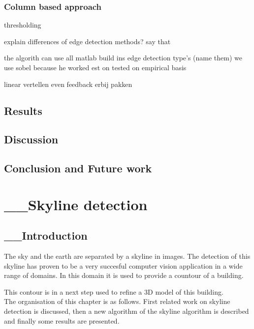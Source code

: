 \documentclass[10pt]{article}
\begin{document}
\subsubsection{Column based approach}

thresholding


explain differences of edge detection methods?
say that 

the algorith can use all matlab build ins edge detection type's (name them)
we use sobel because he worked est on tested on empirical basis

linear vertellen
even feedback erbij pakken


\subsection{Results}%
\subsection{Discussion}  %
\subsection{Conclusion and Future work}





\section{__Skyline detection}
 \subsection{__Introduction}

The sky and the earth are separated by a skyline in images. The detection of this skyline
has proven to be a very succesful computer vision application in a wide range of
domains. In this domain it is used to provide a countour of a building. 

This
contour is in a next step used to refine a 3D model of this building.\\
The organisation of this chapter is as follows.  First related work on skyline
detection is discussed, then a new algorithm of the skyline algorithm is
described and finally some results are presented.\\
\end{document}
